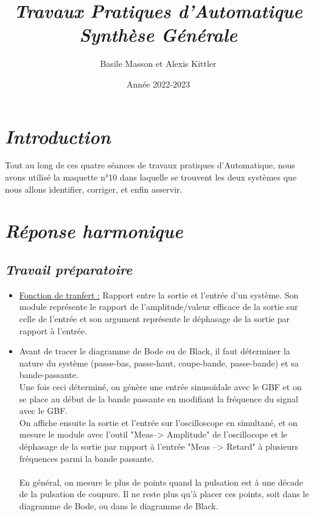 \documentclass[12pt]{article}
\title{\bf \itshape Travaux Pratiques d'Automatique \\ Synthèse Générale}
\author{Basile Masson et Alexis Kittler}
\date{Année 2022-2023}
\begin{document}
\maketitle

\section{\itshape Introduction}

Tout au long de ces quatre séances de travaux pratiques d'Automatique, nous avons utilisé la maquette n°10 dans laquelle se trouvent les deux systèmes que nous allons identifier, corriger, et enfin asservir.

\section{\itshape Réponse harmonique}

\subsection{\itshape Travail préparatoire}

    \begin{itemize} %

    \item \underline{Fonction de tranfert :} Rapport entre la sortie et l'entrée d'un système. Son module représente le rapport de l'amplitude/valeur efficace de la sortie sur celle de l'entrée et son argument représente le déphasage de la sortie par rapport à l'entrée.
    \item Avant de tracer le diagramme de Bode ou de Black, il faut déterminer la nature du système (passe-bas, passe-haut, coupe-bande, passe-bande) et sa bande-passante.\\
     Une fois ceci déterminé, on génère une entrée sinusoïdale avec le GBF et on se place au début de la bande passante en modifiant la fréquence du signal avec le GBF. \\
     On affiche ensuite la sortie et l'entrée sur l'oscilloscope en simultané, et on mesure le module avec l'outil "Meas--> Amplitude" de l'oscillocope et le déphasage de la sortie par rapport à l'entrée "Meas --> Retard" à plusieurs fréquences parmi la bande passante.\\\\ En général, on mesure le plus de points quand la pulsation est à une décade de la pulsation de coupure. Il ne reste plus qu'à placer ces points, soit dans le diagramme de Bode, ou dans le diagramme de Black.
    \end{itemize}
\end{document}
